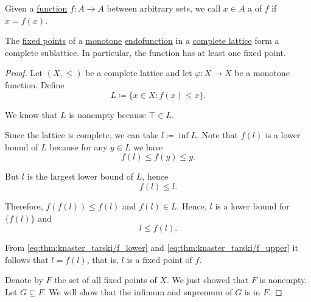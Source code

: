 \begin{definition}\label{def:fixed_point}
  Given a \hyperref[def:function]{function} \( f: A \to A \) between arbitrary sets, we call \( x \in A \) a  of \( f \) if \( x = f(x) \).
\end{definition}

\begin{theorem}\label{thm:knaster_tarski_theorem}
  The \hyperref[def:fixed_point]{fixed points} of a \hyperref[def:partially_ordered_set/homomorphism]{monotone} \hyperref[def:multi_valued_function/endofunction]{endofunction} in a \hyperref[def:semilattice/lattice]{complete lattice} form a complete sublattice. In particular, the function has at least one fixed point.
\end{theorem}
\begin{proof}
  Let \( (X, \leq) \) be a complete lattice and let \( \varphi: X \to X \) be a monotone function. Define
  \begin{equation*}
    L \coloneqq \{ x \in X \colon f(x) \leq x \}.
  \end{equation*}

  We know that \( L \) is nonempty because \( \top \in L \).

  Since the lattice is complete, we can take \( l \coloneqq \inf L \). Note that \( f(l) \) is a lower bound of \( L \) because for any \( y \in L \) we have
  \begin{equation*}
    f(l) \leq f(y) \leq y.
  \end{equation*}

  But \( l \) is the largest lower bound of \( L \), hence
  \begin{equation}\label{eq:thm:knaster_tarski/f_lower}
    f(l) \leq l.
  \end{equation}

  Therefore, \( f(f(l)) \leq f(l) \) and \( f(l) \in L \). Hence, \( l \) is a lower bound for \( \{ f(l) \} \) and
  \begin{equation}\label{eq:thm:knaster_tarski/f_upper}
    l \leq f(l).
  \end{equation}

  From \eqref{eq:thm:knaster_tarski/f_lower} and \eqref{eq:thm:knaster_tarski/f_upper} it follows that \( l = f(l) \), that is, \( l \) is a fixed point of \( f \).

  Denote by \( F \) the set of all fixed points of \( X \). We just showed that \( F \) is nonempty. Let \( G \subseteq F \). We will show that the infimum and supremum of \( G \) is in \( F \).


\end{proof}
